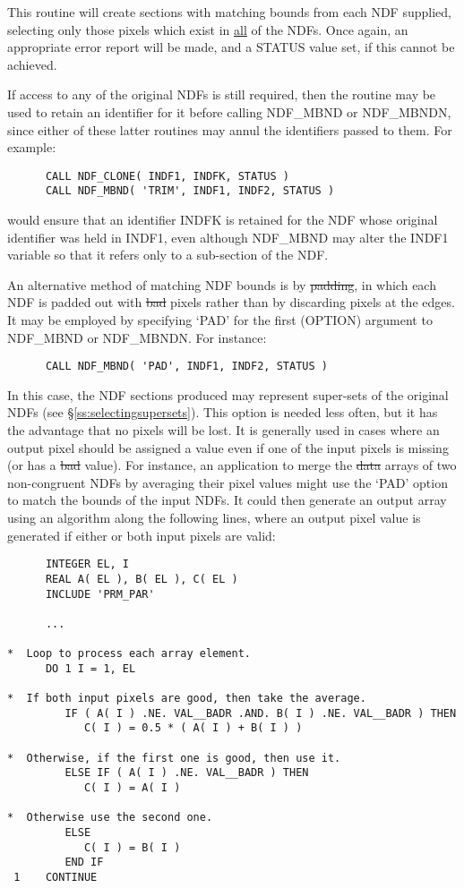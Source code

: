 This routine will create sections with matching bounds from each NDF
supplied, selecting only those pixels which exist in \underline{all} of the
NDFs. 
Once again, an appropriate error report will be made, and a STATUS value
set, if this cannot be achieved. 

If access to any of the original NDFs is still required, then the routine
 may be used to retain an identifier for it before calling
NDF\_MBND or NDF\_MBNDN, since either of these latter routines may annul the
identifiers passed to them. 
For example:

\small
\begin{verbatim}
      CALL NDF_CLONE( INDF1, INDFK, STATUS )
      CALL NDF_MBND( 'TRIM', INDF1, INDF2, STATUS )
\end{verbatim}
\normalsize

would ensure that an identifier INDFK is retained for the NDF whose original
identifier was held in INDF1, even although NDF\_MBND may alter the INDF1
variable so that it refers only to a sub-section of the NDF.

An alternative method of matching NDF bounds is by \st{padding}, in which 
each NDF is padded out with \st{bad\/} pixels rather than by discarding 
pixels at the edges.
It may be employed by specifying `PAD' for the first (OPTION) argument to
NDF\_MBND or NDF\_MBNDN. 
For instance:

\small
\begin{verbatim}
      CALL NDF_MBND( 'PAD', INDF1, INDF2, STATUS )
\end{verbatim}
\normalsize

In this case, the NDF sections produced may represent super-sets of the
original NDFs (see \S\ref{ss:selectingsupersets}). 
This option is needed less often, but it has the advantage that no pixels
will be lost. 
It is generally used in cases where an output pixel should be assigned a
value even if one of the input pixels is missing (or has a \st{bad\/} value). 
For instance, an application to merge the \st{data\/} arrays of two
non-congruent NDFs by averaging their pixel values might use the `PAD'
option to match the bounds of the input NDFs.
It could then generate an output array using an algorithm along the
following lines, where an output pixel value is generated if either or both
input pixels are valid: 

\small
\begin{verbatim}
      INTEGER EL, I
      REAL A( EL ), B( EL ), C( EL )
      INCLUDE 'PRM_PAR'

      ...

*  Loop to process each array element.
      DO 1 I = 1, EL

*  If both input pixels are good, then take the average.
         IF ( A( I ) .NE. VAL__BADR .AND. B( I ) .NE. VAL__BADR ) THEN
            C( I ) = 0.5 * ( A( I ) + B( I ) )

*  Otherwise, if the first one is good, then use it.
         ELSE IF ( A( I ) .NE. VAL__BADR ) THEN
            C( I ) = A( I )

*  Otherwise use the second one.
         ELSE
            C( I ) = B( I )
         END IF
 1    CONTINUE
\end{verbatim}
\normalsize

